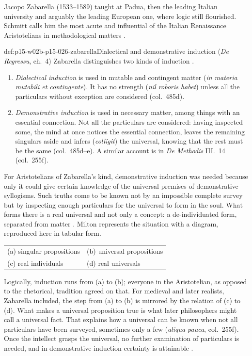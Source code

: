 Jacopo Zabarella (1533--1589) taught at Padua, then the leading Italian
university and arguably the leading European one, where logic still
flourished. Schmitt calls him the most acute and influential of the Italian
Renaissance Aristotelians in methodological matters
\cite[p.~21]{Milton2011InductionBeforeHume}.

\begin{hbdefinition}{def:p15-w02b-p15-026-zabarella}{Dialectical and demonstrative induction (\emph{De Regressu}, ch.~4)}
Zabarella distinguishes two kinds of induction
\cite[pp.~21--22]{Milton2011InductionBeforeHume}.
\begin{enumerate}
\item \emph{Dialectical induction} is used in mutable and contingent
  matter (\emph{in materia mutabili et contingente}). It has no strength
  (\emph{nil roboris habet}) unless all the particulars without exception
  are considered (col.~485d).
\item \emph{Demonstrative induction} is used in necessary matter, among
  things with an essential connection. Not all the particulars are
  considered: having inspected some, the mind at once notices the essential
  connection, leaves the remaining singulars aside and infers
  (\emph{colligit}) the universal, knowing that the rest must be the same
  (col.~485d--e). A similar account is in \emph{De Methodis} III.~14
  (col.~255f).
\end{enumerate}
\end{hbdefinition}

For Aristotelians of Zabarella's kind, demonstrative induction was needed
because only it could give certain knowledge of the universal premises of
demonstrative syllogisms. Such truths come to be known not by an
impossible complete survey but by inspecting enough particulars for the
universal to form in the soul. What forms there is a real universal and not only a
concept: a de-individuated form, separated from matter
\cite[p.~22]{Milton2011InductionBeforeHume}. Milton represents the
situation with a diagram, reproduced here in tabular form.
\begin{center}
\begin{tabular}{ll}
(a) singular propositions & (b) universal propositions\\
(c) real individuals & (d) real universals
\end{tabular}
\end{center}
Logically, induction runs from (a) to (b); everyone in the Aristotelian,
as opposed to the rhetorical, tradition agreed on that. For medieval and
later realists, Zabarella included, the step from (a) to (b) is mirrored
by the relation of (c) to (d). What makes a universal proposition true is
what later philosophers might call a universal fact. That explains how a
universal can be known when not all particulars have been surveyed,
sometimes only a few (\emph{aliqua pauca}, col.~255f). Once the
intellect grasps the universal, no further examination of particulars is
needed, and in demonstrative induction certainty is attainable
\cite[p.~22]{Milton2011InductionBeforeHume}.

